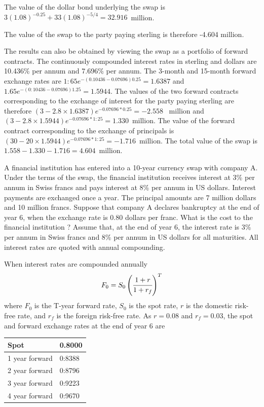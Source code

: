 \documentclass[12pt,a4paper]{exam}
\begin{document}
\begin{questions}
\begin{solution}
The value of the dollar bond underlying the swap is $3(1.08)^{-0.25} + 33(1.08)^{-5/4} = 32.916$~million.

The value of the swap to the party paying sterling is therefore
-4.604 million.

The results can also be obtained by viewing the swap as a portfolio of forward contracts. The continuously compounded interest rates in sterling and dollars are 10.436\% per annum and 7.696\% per annum. The 3-month and 15-month forward exchange rates are
$1:65e^{-(0.10436-0.07696)0.25}= 1.6387$ and $1.65e^{-(0:10436-0.07696)1.25} = 1.5944$.
The values of the two forward contracts corresponding to the exchange of interest for the party paying sterling are therefore
$(3-2.8\times  1.6387) e^{-0.07696*0.25} = -2.558$~ million
and $(3- 2.8\times  1.5944) e^{-0.07696*1:25} = 1.330$~million.
The value of the forward contract corresponding to the exchange of principals is $(30-20\times 1.5944) e^{-0.07696*1:25} = -1.716$~million.
The total value of the swap is $1.558-1.330-1.716 = 4.604$~million.
\end{solution}

\question A financial institution has entered into a 10-year currency swap with company A.
Under the terms of the swap, the financial institution receives interest at 3\% per annum in Swiss francs and pays interest at 8\% per annum in US dollars. Interest payments are exchanged once a year. The principal amounts are 7 million dollars and 10 million
francs. Suppose that company A declares bankruptcy at the end of year 6, when the exchange rate is 0.80 dollars per franc. What is the cost to the financial institution ? Assume that, at the end of year 6, the interest rate is 3\% per annum in Swiss francs and 8\%
per annum in US dollars for all maturities. All interest rates are quoted with annual compounding.

\begin{solution}
When interest rates are compounded annually
\begin{equation*}
	F_0 = S_0\left(\cfrac{1+r}{1+r_f}\right)^T
\end{equation*}
where $F_0$ is the T-year forward rate, $S_0$ is the spot rate, $r$ is the domestic risk-free rate, and $r_f$ is the foreign risk-free rate. As $r = 0.08$ and $r_f = 0.03$, the spot and forward
exchange rates at the end of year 6 are

\begin{center}
	\begin{tabular}{|l|l|}
\hline
Spot & 0.8000 \\ \hline
1 year forward & 0:8388 \\ \hline
2 year forward & 0:8796 \\ \hline
3 year forward & 0:9223 \\ \hline
4 year forward & 0:9670 \\ \hline
	\end{tabular}
\end{center}


\end{solution}
\end{questions}
\end{document}
